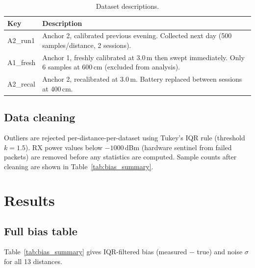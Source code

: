 \documentclass[10pt,a4paper,twocolumn]{article}
\begin{document}
\begin{table}[H]
\centering
\caption{Dataset descriptions.}
\label{tab:datasets}
\begin{tabular}{lp{5cm}}
\toprule
Key & Description \\
\midrule
A2\_run1 & Anchor 2, calibrated previous evening.
           Collected next day (500 samples/distance, 2 sessions). \\
A1\_fresh & Anchor 1, freshly calibrated at 3.0\,m then swept immediately.
            Only 6 samples at 600\,cm (excluded from analysis). \\
A2\_recal & Anchor 2, recalibrated at 3.0\,m.
            Battery replaced between sessions at 400\,cm. \\
\bottomrule
\end{tabular}
\end{table}

\subsection{Data cleaning}

Outliers are rejected per-distance-per-dataset using Tukey's IQR rule
(threshold $k = 1.5$).  RX power values below $-1000$\,dBm (hardware sentinel
from failed packets) are removed before any statistics are computed.  Sample
counts after cleaning are shown in Table~\ref{tab:bias_summary}.

\section{Results}

\subsection{Full bias table}

Table~\ref{tab:bias_summary} gives IQR-filtered bias
(measured $-$ true) and noise $\sigma$ for all 13 distances.
\end{document}

